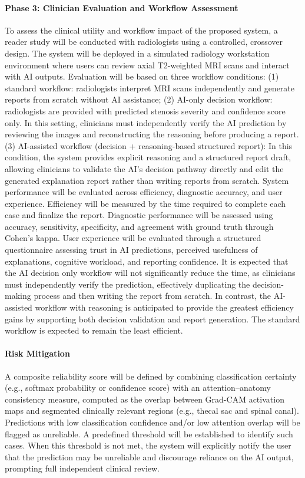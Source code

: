 \documentclass[12pt]{article}
\begin{document}
\paragraph{Phase 3: Clinician Evaluation and Workflow Assessment}
To assess the clinical utility and workflow impact of the proposed system, a reader study will be conducted with radiologists using a controlled, crossover design. The system will be deployed in a simulated radiology workstation environment where users can review axial T2-weighted MRI scans and interact with AI outputs. Evaluation will be based on three workflow conditions: (1) standard workflow: radiologists interpret MRI scans independently and generate reports from scratch without AI assistance; (2) AI-only decision workflow: radiologists are provided with predicted stenosis severity and confidence score only. In this setting, clinicians must independently verify the AI prediction by reviewing the images and reconstructing the reasoning before producing a report. (3) AI-assisted workflow (decision + reasoning-based structured report): In this condition, the system provides explicit reasoning and a structured report draft, allowing clinicians to validate the AI’s decision pathway directly and edit the generated explanation report rather than writing reports from scratch.
System performance will be evaluated across efficiency, diagnostic accuracy, and user experience. Efficiency will be measured by the time required to complete each case and finalize the report. Diagnostic performance will be assessed using accuracy, sensitivity, specificity, and agreement with ground truth through Cohen’s kappa. User experience will be evaluated through a structured questionnaire assessing trust in AI predictions, perceived usefulness of explanations, cognitive workload, and reporting confidence.
It is expected that the AI decision only workflow will not significantly reduce the time, as clinicians must independently verify the prediction, effectively duplicating the decision-making process and then writing the report from scratch. In contrast, the AI-assisted workflow with reasoning is anticipated to provide the greatest efficiency gains by supporting both decision validation and report generation. The standard workflow is expected to remain the least efficient.

\paragraph{Risk Mitigation}
A composite reliability score will be defined by combining classification certainty (e.g., softmax probability or confidence score) with an attention–anatomy consistency measure, computed as the overlap between Grad-CAM activation maps and segmented clinically relevant regions (e.g., thecal sac and spinal canal). Predictions with low classification confidence and/or low attention overlap will be flagged as unreliable. A predefined threshold will be established to identify such cases. When this threshold is not met, the system will explicitly notify the user that the prediction may be unreliable and discourage reliance on the AI output, prompting full independent clinical review.
\end{document}
